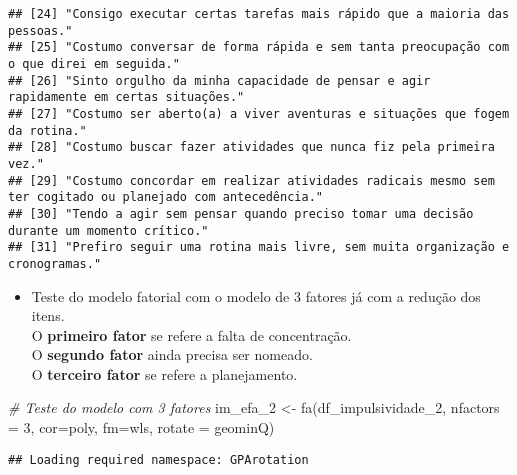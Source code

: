 \documentclass[
]{article}
\newenvironment{Shaded}{\begin{snugshade}}{\end{snugshade}}
\newcommand{\AttributeTok}[1]{\textcolor[rgb]{0.77,0.63,0.00}{#1}}
\newcommand{\CommentTok}[1]{\textcolor[rgb]{0.56,0.35,0.01}{\textit{#1}}}
\newcommand{\FunctionTok}[1]{\textcolor[rgb]{0.00,0.00,0.00}{#1}}
\newcommand{\NormalTok}[1]{#1}
\newcommand{\OtherTok}[1]{\textcolor[rgb]{0.56,0.35,0.01}{#1}}
\newcommand{\SpecialCharTok}[1]{\textcolor[rgb]{0.00,0.00,0.00}{#1}}
\newcommand{\StringTok}[1]{\textcolor[rgb]{0.31,0.60,0.02}{#1}}
\providecommand{\tightlist}{%
  \setlength{\itemsep}{0pt}\setlength{\parskip}{0pt}}
\begin{document}
\begin{verbatim}
## [24] "Consigo executar certas tarefas mais rápido que a maioria das pessoas."                                 
## [25] "Costumo conversar de forma rápida e sem tanta preocupação com o que direi em seguida."                  
## [26] "Sinto orgulho da minha capacidade de pensar e agir rapidamente em certas situações."                    
## [27] "Costumo ser aberto(a) a viver aventuras e situações que fogem da rotina."                               
## [28] "Costumo buscar fazer atividades que nunca fiz pela primeira vez."                                       
## [29] "Costumo concordar em realizar atividades radicais mesmo sem ter cogitado ou planejado com antecedência."
## [30] "Tendo a agir sem pensar quando preciso tomar uma decisão durante um momento crítico."                   
## [31] "Prefiro seguir uma rotina mais livre, sem muita organização e cronogramas."
\end{verbatim}

\begin{itemize}
\tightlist
\item
  Teste do modelo fatorial com o modelo de 3 fatores já com a redução
  dos itens.\\
  O \textbf{primeiro fator} se refere a falta de concentração.\\
  O \textbf{segundo fator} ainda precisa ser nomeado.\\
  O \textbf{terceiro fator} se refere a planejamento.
\end{itemize}

\begin{Shaded}
\begin{Highlighting}[]
\CommentTok{\# Teste do modelo com 3 fatores}
\NormalTok{im\_efa\_2 }\OtherTok{\textless{}{-}} \FunctionTok{fa}\NormalTok{(df\_impulsividade\_2, }\AttributeTok{nfactors =} \StringTok{\textquotesingle{}3\textquotesingle{}}\NormalTok{, }\AttributeTok{cor=}\StringTok{\textquotesingle{}poly\textquotesingle{}}\NormalTok{, }
             \AttributeTok{fm=}\StringTok{\textquotesingle{}wls\textquotesingle{}}\NormalTok{, }\AttributeTok{rotate =} \StringTok{\textquotesingle{}geominQ\textquotesingle{}}\NormalTok{)}
\end{Highlighting}
\end{Shaded}

\begin{verbatim}
## Loading required namespace: GPArotation
\end{verbatim}

\begin{Shaded}
\end{Shaded}
\end{document}
